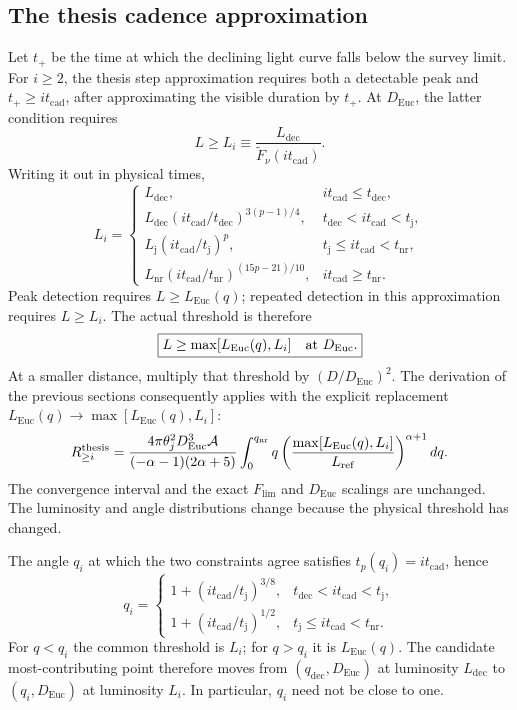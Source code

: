 \documentclass[11pt,a4paper]{article}
\newcommand{\Euc}{\mathrm{Euc}}
\newcommand{\dec}{\mathrm{dec}}
\newcommand{\nr}{\mathrm{nr}}
\newcommand{\Flim}{F_{\mathrm{lim}}}
\newcommand{\Lref}{L_{\mathrm{ref}}}
\newcommand{\Ldec}{L_{\mathrm{dec}}}
\newcommand{\Lj}{L_{\mathrm j}}
\newcommand{\Lnr}{L_{\mathrm{nr}}}
\newcommand{\tcad}{t_{\mathrm{cad}}}
\newcommand{\tdec}{t_{\mathrm{dec}}}
\newcommand{\tj}{t_{\mathrm j}}
\newcommand{\tnr}{t_{\mathrm{nr}}}
\newcommand{\ft}{\widetilde F_\nu}
\begin{document}
\subsection{The thesis cadence approximation}
Let $t_+$ be the time at which the declining light curve falls below the
survey limit. For $i\ge2$, the thesis step approximation requires both a detectable peak
and $t_+\ge i\tcad$, after approximating the visible duration by $t_+$.
At $D_\Euc$, the latter condition requires
\begin{equation}
 L\ge L_i\equiv\frac{\Ldec}{\ft(i\tcad)}.
 \label{eq:Li}
\end{equation}
Writing it out in physical times,
\begin{equation}
 L_i=\begin{cases}
 \Ldec,&i\tcad\le\tdec,\\
 \Ldec(i\tcad/\tdec)^{3(p-1)/4},&\tdec<i\tcad<\tj,\\
 \Lj(i\tcad/\tj)^p,&\tj\le i\tcad<\tnr,\\
 \Lnr(i\tcad/\tnr)^{(15p-21)/10},&i\tcad\ge\tnr.
 \end{cases}
 \label{eq:Li-explicit}
\end{equation}
Peak detection requires $L\ge L_\Euc(q)$; repeated detection in this
approximation requires $L\ge L_i$. The actual threshold is therefore
\begin{equation}
 \boxed{L\ge\max[L_\Euc(q),L_i]\quad\hbox{at }D_\Euc.}
 \label{eq:cad-threshold}
\end{equation}
At a smaller distance, multiply that threshold by $(D/D_\Euc)^2$.
The derivation of the previous sections consequently applies with the
explicit replacement
$L_\Euc(q)\longrightarrow\max[L_\Euc(q),L_i]$:
\begin{equation}
 R_{\ge i}^{\rm thesis}=
 \frac{4\pi\theta_j^2D_\Euc^3\mathcal A}
 {(-\alpha-1)(2\alpha+5)}
 \int_0^{q_\nr}q
 \left(\frac{\max[L_\Euc(q),L_i]}{\Lref}\right)^{\alpha+1}dq.
 \label{eq:cad-rate}
\end{equation}
The convergence interval and the exact $\Flim$ and $D_\Euc$ scalings are
unchanged. The luminosity and angle distributions change because the
physical threshold has changed.

The angle $q_i$ at which the two constraints agree satisfies
$t_p(q_i)=i\tcad$, hence
\begin{equation}
 q_i=\begin{cases}
 1+(i\tcad/\tj)^{3/8},&\tdec<i\tcad<\tj,\\
 1+(i\tcad/\tj)^{1/2},&\tj\le i\tcad<\tnr.
 \end{cases}
 \label{eq:qi}
\end{equation}
For $q<q_i$ the common threshold is $L_i$; for $q>q_i$ it is
$L_\Euc(q)$. The candidate most-contributing point therefore moves from
$(q_\dec,D_\Euc)$ at luminosity $\Ldec$ to
$(q_i,D_\Euc)$ at luminosity $L_i$. In particular, $q_i$ need not be close
to one.
\end{document}
